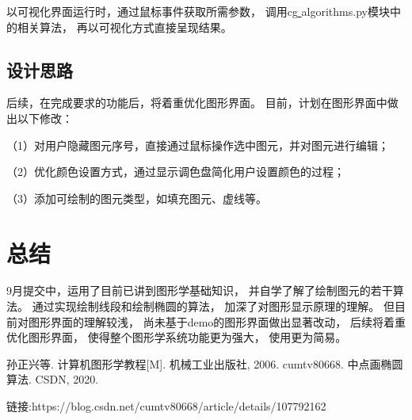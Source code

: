 \documentclass[a4paper,UTF8]{article}
\theoremstyle{definition}
\begin{document}
以可视化界面运行时，通过鼠标事件获取所需参数，
调用cg\underline{ }algorithms.py模块中的相关算法，
再以可视化方式直接呈现结果。

\subsection{设计思路}
后续，在完成要求的功能后，将着重优化图形界面。
目前，计划在图形界面中做出以下修改：

（1）对用户隐藏图元序号，直接通过鼠标操作选中图元，并对图元进行编辑；

（2）优化颜色设置方式，通过显示调色盘简化用户设置颜色的过程；

（3）添加可绘制的图元类型，如填充图元、虚线等。


\section{总结}
9月提交中，运用了目前已讲到图形学基础知识，
并自学了解了绘制图元的若干算法。
通过实现绘制线段和绘制椭圆的算法，
加深了对图形显示原理的理解。
但目前对图形界面的理解较浅，
尚未基于demo的图形界面做出显著改动，
后续将着重优化图形界面，
使得整个图形学系统功能更为强大，
使用更为简易。


\begin{thebibliography}{99}
 孙正兴等. 计算机图形学教程[M]. 机械工业出版社, 2006.
 cumtv80668. 中点画椭圆算法. CSDN, 2020.

链接:https://blog.csdn.net/cumtv80668/article/details/107792162
\end{thebibliography}
\end{document}
